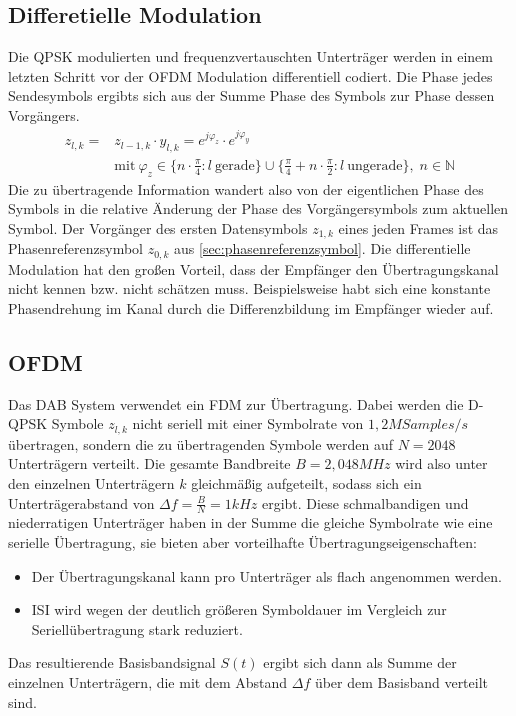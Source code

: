 \subsection{Differetielle Modulation}
Die QPSK modulierten und frequenzvertauschten Unterträger werden in einem letzten Schritt vor der OFDM Modulation differentiell codiert. Die Phase jedes Sendesymbols ergibts sich aus der Summe Phase des Symbols zur Phase dessen Vorgängers.
\begin{equation}
\begin{aligned}
z_{l,k} = &z_{l-1,k}\cdot y_{l,k} = e^{j\varphi_z} \cdot e^{j\varphi_y} \\
&\text{mit} \: \varphi_z \in \{n \cdot \frac{\pi}{4}: l \: \text{gerade}\} \cup \{\frac{\pi}{4} + n \cdot \frac{\pi}{2}: l \: \text{ungerade}\}, \; n\in \mathbb{N} 
\end{aligned}
\end{equation}
Die zu übertragende Information wandert also von der eigentlichen Phase des Symbols in die relative Änderung der Phase des Vorgängersymbols zum aktuellen Symbol. Der Vorgänger des ersten Datensymbols $z_{1,k}$ eines jeden Frames ist das Phasenreferenzsymbol $z_{0,k}$ aus \ref{sec:phasenreferenzsymbol}. Die differentielle Modulation hat den großen Vorteil, dass der Empfänger den Übertragungskanal nicht kennen bzw. nicht schätzen muss. Beispielsweise habt sich eine konstante Phasendrehung im Kanal durch die Differenzbildung im Empfänger wieder auf.

\subsection{\ac{OFDM}}
\label{sec:ofdm}
Das DAB System verwendet ein \ac{FDM} zur Übertragung. Dabei werden die D-QPSK Symbole $z_{l,k}$ nicht seriell mit einer Symbolrate von $1,2 M Samples / s$ übertragen, sondern die zu übertragenden Symbole werden auf $N=2048$ Unterträgern verteilt. Die gesamte Bandbreite $B = 2,048 MHz$ wird also unter den einzelnen Unterträgern $k$ gleichmäßig aufgeteilt, sodass sich ein Unterträgerabstand von $\Delta f = \frac{B}{N} = 1kHz$ ergibt. Diese schmalbandigen und niederratigen Unterträger haben in der Summe die gleiche Symbolrate wie eine serielle Übertragung, sie bieten aber vorteilhafte Übertragungseigenschaften:
\begin{itemize}
\item Der Übertragungskanal kann pro Unterträger als flach angenommen werden.
\item \ac{ISI} wird wegen der deutlich größeren Symboldauer im Vergleich zur Seriellübertragung stark reduziert.
\end{itemize}
Das resultierende Basisbandsignal $S(t)$ ergibt sich dann als Summe der einzelnen Unterträgern, die mit dem Abstand $\Delta f$ über dem Basisband verteilt sind.

